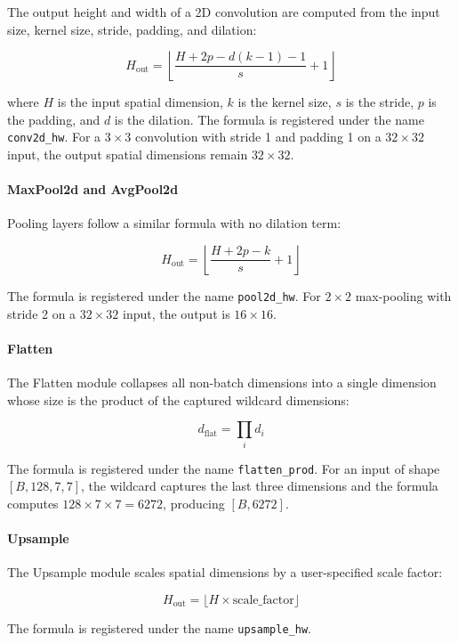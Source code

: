 \documentclass[11pt,a4paper]{article}
\begin{document}
The output height and width of a 2D convolution are computed from the input size, kernel size, stride, padding, and dilation:

\[
H_{\text{out}} = \left\lfloor \frac{H + 2p - d(k - 1) - 1}{s} + 1 \right\rfloor
\]

where $H$ is the input spatial dimension, $k$ is the kernel size, $s$ is the stride, $p$ is the padding, and $d$ is the dilation. The formula is registered under the name \texttt{conv2d\_hw}. For a $3 \times 3$ convolution with stride 1 and padding 1 on a $32 \times 32$ input, the output spatial dimensions remain $32 \times 32$.

\paragraph{MaxPool2d and AvgPool2d}

Pooling layers follow a similar formula with no dilation term:

\[
H_{\text{out}} = \left\lfloor \frac{H + 2p - k}{s} + 1 \right\rfloor
\]

The formula is registered under the name \texttt{pool2d\_hw}. For $2 \times 2$ max-pooling with stride 2 on a $32 \times 32$ input, the output is $16 \times 16$.

\paragraph{Flatten}

The Flatten module collapses all non-batch dimensions into a single dimension whose size is the product of the captured wildcard dimensions:

\[
d_{\text{flat}} = \prod_i d_i
\]

The formula is registered under the name \texttt{flatten\_prod}. For an input of shape $[B, 128, 7, 7]$, the wildcard captures the last three dimensions and the formula computes $128 \times 7 \times 7 = 6272$, producing $[B, 6272]$.

\paragraph{Upsample}

The Upsample module scales spatial dimensions by a user-specified scale factor:

\[
H_{\text{out}} = \lfloor H \times \text{scale\_factor} \rfloor
\]

The formula is registered under the name \texttt{upsample\_hw}.
\end{document}
